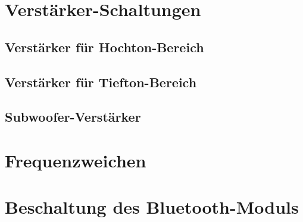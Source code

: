 \newpage
\section{Verstärker-Schaltungen}

\subsection{Verstärker für Hochton-Bereich}

\subsection{Verstärker für Tiefton-Bereich}

\subsection{Subwoofer-Verstärker}


\section{Frequenzweichen}


\section{Beschaltung des Bluetooth-Moduls}

